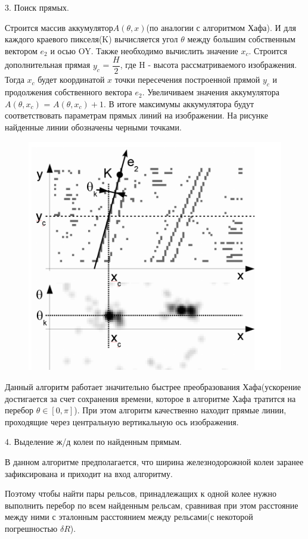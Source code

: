 3. Поиск прямых.

Строится массив аккумулятор$A(\theta, x)$(по аналогии с алгоритмом Хафа\cite{b:hough_transform}). И для каждого краевого пикселя(K) вычисляется угол $\theta$ между большим собственным вектором $e_2$ и осью OY. 
Также необходимо вычислить значение $x_c$. Строится дополнительная прямая $y_c$ = $\dfrac{H}{2}$, где H - высота рассматриваемого изображения. Тогда $x_c$ будет координатой $x$ точки пересечения построенной прямой $y_c$ и продолжения собственного вектора $e_2$.
Увеличиваем значения аккумулятора $A(\theta, x_c)$ = $A(\theta, x_c) + 1$.
В итоге максимумы аккумулятора будут соответствовать параметрам прямых линий на изображении. На рисунке найденные линии обозначены черными точками.
\begin{figure}[!h]
	\centering
	\includegraphics[width=0.9\linewidth]{pictures/screenshot004}
	\caption{}
	\label{fig:screenshot004}
\end{figure}
\newpage
Данный алгоритм работает значительно быстрее преобразования Хафа(ускорение достигается за счет сохранения времени, которое в алгоритме Хафа тратится на перебор $\theta \in [0, \pi]$).
При этом алгоритм качественно находит прямые линии, проходящие через центральную вертикальную ось изображения.

4. Выделение ж/д колеи по найденным прямым.

В данном алгоритме предполагается, что ширина железнодорожной колеи заранее зафиксирована и приходит на вход алгоритму. 

Поэтому чтобы найти пары рельсов, принадлежащих к одной колее нужно выполнить перебор по всем найденным рельсам, сравнивая при этом расстояние между ними с эталонным расстоянием между рельсами(с некоторой погрешностью $\delta R$).

